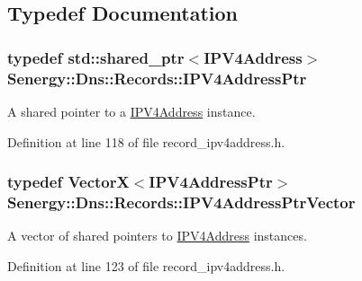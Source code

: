 \subsection{Typedef Documentation}
\hypertarget{namespace_senergy_1_1_dns_1_1_records_a3f0d02fcd6381aee3fab67589ac0890c}{
\subsubsection[{I\-P\-V4\-Address\-Ptr}]{\setlength{\rightskip}{0pt plus 5cm}typedef std\-::shared\-\_\-ptr$<${\bf I\-P\-V4\-Address}$>$ {\bf Senergy\-::\-Dns\-::\-Records\-::\-I\-P\-V4\-Address\-Ptr}}}\label{namespace_senergy_1_1_dns_1_1_records_a3f0d02fcd6381aee3fab67589ac0890c}


A shared pointer to a \hyperlink{class_senergy_1_1_dns_1_1_records_1_1_i_p_v4_address}{I\-P\-V4\-Address} instance. 



Definition at line 118 of file record\-\_\-ipv4address.\-h.

\hypertarget{namespace_senergy_1_1_dns_1_1_records_a5b9115e6124c4999bbb000e69cfe5d2c}{
\subsubsection[{I\-P\-V4\-Address\-Ptr\-Vector}]{\setlength{\rightskip}{0pt plus 5cm}typedef {\bf Vector\-X}$<${\bf I\-P\-V4\-Address\-Ptr}$>$ {\bf Senergy\-::\-Dns\-::\-Records\-::\-I\-P\-V4\-Address\-Ptr\-Vector}}}\label{namespace_senergy_1_1_dns_1_1_records_a5b9115e6124c4999bbb000e69cfe5d2c}


A vector of shared pointers to \hyperlink{class_senergy_1_1_dns_1_1_records_1_1_i_p_v4_address}{I\-P\-V4\-Address} instances. 



Definition at line 123 of file record\-\_\-ipv4address.\-h.

